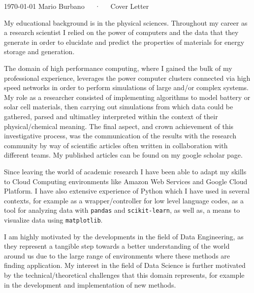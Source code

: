\documentclass[11pt, a4paper]{awesome-cv}
\begin{document}
\makecvheader[R]

\makecvfooter
  {\today}
  {Mario Burbano~~~·~~~Cover Letter}
  {}

\makelettertitle

\begin{cvletter}


My educational background is in the physical sciences. Throughout my career as a research scientist I relied on the power of computers and the data that they generate in order to elucidate and predict the properties of materials for energy storage and generation.

The domain of high performance computing, where I gained the bulk of my professional experience, leverages the power computer clusters connected via high speed networks in order to perform simulations of large and/or complex systems. My role as a researcher consisted of implementing algorithms to model battery or solar cell materials, then carrying out simulations from which data could be gathered, parsed and ultimatley interpreted within the context of their physical/chemical meaning. The final aspect, and crown achievement of this investigative process, was the communication of the results with the research community by way of scientific articles often written in collaboration with different teams. My published articles can be found on my google scholar page.

Since leaving the world of academic research I have been able to adapt my skills to Cloud Computing environments like Amazon Web Services and Google Cloud Platform. I have also extensive experience of Python which I have used in several contexts, for example as a wrapper/controller for low level language codes, as a tool for analyzing data with \texttt{pandas} and \texttt{scikit-learn}, as well as, a means to visualize data using \texttt{matplotlib}.

I am highly motivated by the developments in the field of Data Engineering, as they represent a tangible step towards a better understanding of the world around us due to the large range of environments where these methods are finding application. My interest in the field of Data Science is further motivated by the technical/theoretical challenges that this domain represents, for example in the development and implementation of new methods. 


\end{cvletter}
\end{document}
